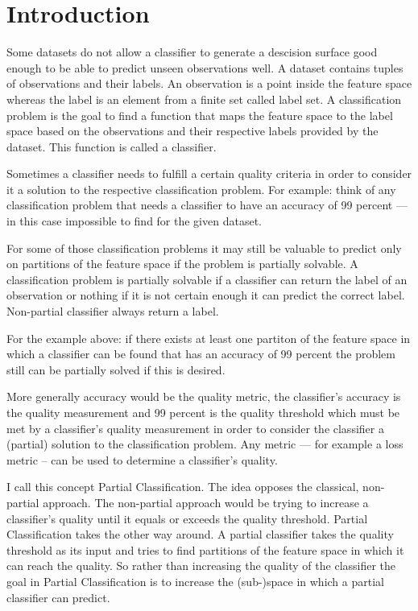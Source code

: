 \section{Introduction}

Some datasets do not allow a classifier to generate a
descision surface good enough to be able to predict unseen
observations well. A dataset contains tuples of
observations and their labels. An observation is a point
inside the feature space whereas the label is an element
from a finite set called label set. A classification
problem is the goal to find a function that maps the
feature space to the label space based on the observations
and their respective labels provided by the dataset.%
\cite[chapter 18]{ki} This function is called a classifier.

Sometimes a classifier needs to fulfill a certain quality
criteria in order to consider it a solution to the
respective classification problem. For example: think of
any classification problem that needs a classifier to have
an accuracy of 99 percent --- in this case impossible to
find for the given dataset.

For some of those classification problems it may still be
valuable to predict only on partitions of the feature
space if the problem is partially solvable. A
classification problem is partially solvable if a
classifier can return the label of an observation or
nothing if it is not certain enough it can predict the
correct label. Non-partial classifier always return a
label.

For the example above: if there exists at least one
partiton of the feature space in which a classifier can be
found that has an accuracy of 99 percent the problem still
can be partially solved if this is desired.

More generally accuracy would be the quality metric,
the classifier's accuracy is the quality measurement and 99
percent is the quality threshold which must be met by a
classifier's quality measurement in order to consider the
classifier a (partial) solution to the classification
problem. Any metric --- for example a loss metric -- can be
used to determine a classifier's quality.

I call this concept Partial Classification. The idea
opposes the classical, non-partial approach. The
non-partial approach would be trying to increase a
classifier's quality until it equals or exceeds the quality
threshold. Partial Classification takes the other way
around. A partial classifier takes the quality threshold as
its input and tries to find partitions of the feature space
in which it can reach the quality. So rather than
increasing the quality of the classifier the goal in
Partial Classification is to increase the (sub-)space in
which a partial classifier can predict.

